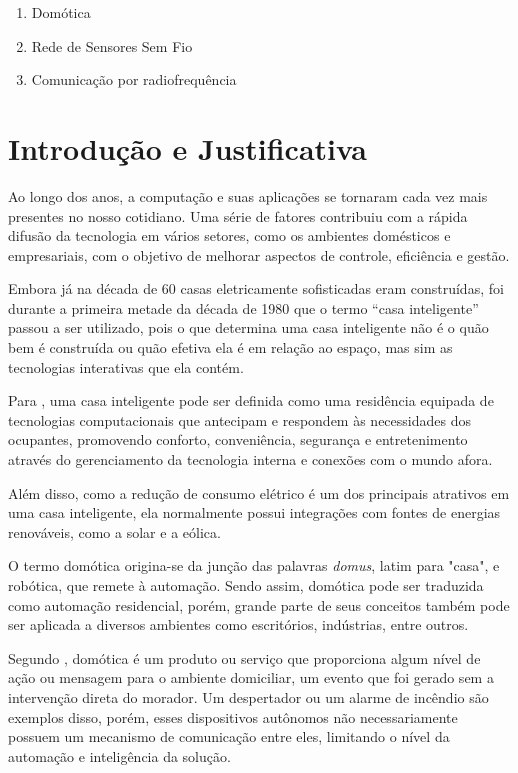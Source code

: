 \documentclass[
    12pt,               %
    a4paper,            %
    english,            %
    brazil,             %
    ]{article}
\begin{document}
        \begin{enumerate}
            \item Domótica
			\item Rede de Sensores Sem Fio
			\item Comunicação por radiofrequência
        \end{enumerate}


\section{Introdução e Justificativa}
Ao longo dos anos, a computação e suas aplicações se tornaram cada vez mais presentes no nosso cotidiano. Uma série de fatores
contribuiu com a rápida difusão da tecnologia em vários setores, como os ambientes domésticos e empresariais, com o objetivo de
melhorar aspectos de controle, eficiência e gestão.

Embora já na década de 60 casas eletricamente sofisticadas eram construídas, foi durante a primeira metade da década de 1980 que o
termo  ``casa inteligente'' passou a ser utilizado, pois o que determina uma casa inteligente não é o quão bem é construída ou
quão efetiva ela é em relação ao espaço, mas sim as tecnologias interativas que ela contém. \cite{harper2003}

Para , uma casa inteligente pode ser definida como uma residência equipada de tecnologias computacionais
que antecipam e respondem às necessidades dos ocupantes, promovendo conforto, conveniência, segurança e entretenimento através do
gerenciamento da tecnologia interna e conexões com o mundo afora.

Além disso, como a redução de consumo elétrico é um dos principais atrativos em uma casa inteligente, ela normalmente possui
integrações com fontes de energias renováveis, como a solar e a eólica.

O termo domótica origina-se da junção das palavras \textit{domus}, latim para "casa", e robótica, que remete à automação. Sendo
assim, domótica pode ser traduzida como automação residencial, porém, grande parte de seus conceitos também pode ser aplicada a
diversos ambientes como escritórios, indústrias, entre outros.

Segundo , domótica é um produto ou serviço que proporciona algum nível de ação ou mensagem para o ambiente
domiciliar, um evento que foi gerado sem a intervenção direta do morador. Um despertador ou um alarme de incêndio são exemplos
disso, porém, esses dispositivos autônomos não necessariamente possuem um mecanismo de comunicação entre eles, limitando o nível
da automação e inteligência da solução.
\end{document}
